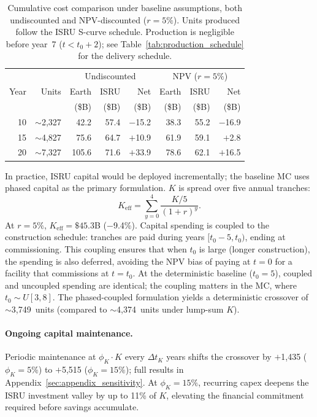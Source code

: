 \documentclass[preprint,12pt]{elsarticle}
\begin{document}
\begin{table}[htbp]
\centering
\caption{Cumulative cost comparison under baseline assumptions, both undiscounted and NPV-discounted ($r = 5\%$). Units produced follow the ISRU S-curve schedule. Production is negligible before year~7 ($t < t_0 + 2$); see Table~\ref{tab:production_schedule} for the delivery schedule.}
\label{tab:cumulative}
\begin{tabular}{@{}rr|rrr|rrr@{}}
\toprule
 & & \multicolumn{3}{c|}{Undiscounted} & \multicolumn{3}{c}{NPV ($r = 5\%$)} \\
Year & Units & Earth & ISRU & Net & Earth & ISRU & Net \\
 & & (\$B) & (\$B) & (\$B) & (\$B) & (\$B) & (\$B) \\
\midrule
10 & $\sim$2{,}327 & 42.2  & 57.4   & $-$15.2 & 38.3  & 55.2  & $-$16.9 \\
15 & $\sim$4{,}827 & 75.6  & 64.7   & $+$10.9 & 61.9  & 59.1  & $+$2.8  \\
20 & $\sim$7{,}327 & 105.6 & 71.6   & $+$33.9 & 78.6  & 62.1  & $+$16.5 \\
\bottomrule
\end{tabular}
\end{table}

In practice, ISRU capital would be deployed incrementally; the baseline MC uses phased capital as the primary formulation. $K$ is spread over five annual tranches:
\begin{equation}
  K_{\mathrm{eff}} = \sum_{y=0}^{4} \frac{K/5}{(1+r)^y}.
  \label{eq:phased_capital}
\end{equation}
At $r = 5\%$, $K_{\mathrm{eff}} = \$45.3$B ($-$9.4\%). Capital spending is coupled to the construction schedule: tranches are paid during years $[t_0 - 5, t_0)$, ending at commissioning. This coupling ensures that when $t_0$ is large (longer construction), the spending is also deferred, avoiding the NPV bias of paying at $t = 0$ for a facility that commissions at $t = t_0$. At the deterministic baseline ($t_0 = 5$), coupled and uncoupled spending are identical; the coupling matters in the MC, where $t_0 \sim U[3,8]$. The phased-coupled formulation yields a deterministic crossover of $\sim$3{,}749~units (compared to $\sim$4{,}374~units under lump-sum $K$).

\paragraph{Ongoing capital maintenance.} Periodic maintenance at $\phi_K \cdot K$ every $\Delta t_K$ years shifts the crossover by $+$1{,}435 ($\phi_K = 5\%$) to $+$5{,}515 ($\phi_K = 15\%$); full results in Appendix~\ref{sec:appendix_sensitivity}. At $\phi_K = 15\%$, recurring capex deepens the ISRU investment valley by up to 11\% of $K$, elevating the financial commitment required before savings accumulate.
\end{document}

